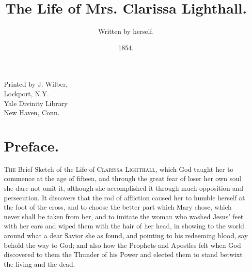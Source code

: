 \documentclass{article}
\title{The Life of Mrs. Clarissa Lighthall.}
\author{Written by herself.}
\date{1854.}
\begin{document}
\maketitle

\noindent Printed by J. Wilber,\\
Lockport, N.Y.\\

\noindent Yale Divinity Library\\
New Haven, Conn.
\section{Preface.}
\textsc{The} Brief Sketch of the Life of \textsc{Clarissa Lighthall}, which God taught her to commence
at the age of fifteen, and through the great fear of loser her own soul she dare not omit it,
although she accomplished it through much opposition and persecution. It discovers that the
rod of affliction caused her to humble herself at the foot of the cross, and to choose the better
part which Mary chose, which never shall be taken from her, and to imitate the woman who
washed Jesus' feet with her ears and wiped them with the hair of her head, in showing to
the world around what a dear Savior she as found, and pointing to his redeeming blood, say
behold the way to God; and also how the Prophets and Apostles felt when God discovered to
them the Thunder of his Power and elected them to stand betwixt the living and the dead.---
\end{document}
